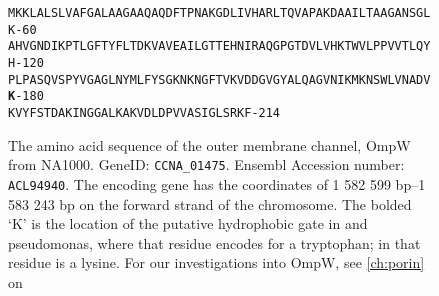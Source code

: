 \begin{figure}[htb]
\end{figure}   
\begin{figure}[htb]
  	\begin{center}
\label{app:ompwseq}
\texttt{\onehalfspacing\small  MKKLALSLVAFGALAAGAAQAQDFTPNAKGDLIVHARLTQVAPAKDAAILTAAGANSGLK\hfill-60~\\
AHVGNDIKPTLGFTYFLTDKVAVEAILGTTEHNIRAQGPGTDVLVHKTWVLPPVVTLQYH\hfill-120\\
PLPASQVSPYVGAGLNYMLFYSGKNKNGFTVKVDDGVGYALQAGVNIKMKNSWLVNADV\textbf{K}\hfill-180\\
KVYFSTDAKINGGALKAKVDLDPVVASIGLSRKF\hfill-214
}
   	\end{center}
   	\caption[OmpW, amino acid sequence]{
   The amino acid sequence of the outer membrane channel, OmpW from \caulobacter NA1000. GeneID: \texttt{CCNA\_01475}. Ensembl Accession number: \texttt{ACL94940}. The encoding gene has the coordinates of 1 582 599 bp--1 583 243 bp on the forward strand of the \caulobacter chromosome. The bolded `K' is the location of the putative hydrophobic gate in \ecoli and \ac{pseudomonas}, where that residue encodes for a tryptophan; in \caulobacter that residue is a lysine. For our investigations into OmpW, see \cref{ch:porin} on }
\end{figure}   
